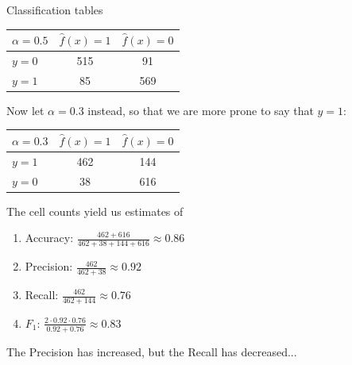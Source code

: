 \documentclass[10pt]{beamer}
\begin{document}
\begin{frame}{Classification tables}

\begin{center}
\begin{tabular}{ l | c | c }
 {\color{uured}$\alpha=0.5$} & $\hat{f}(x)=1$ & $\hat{f}(x)=0$\\
  \hline
  $y=0$ & 515 & 91 \\
  $y=1$ & 85 & 569 \\
  \hline
\end{tabular}
\end{center}
\pause
Now let $\alpha=0.3$ instead, so that we are more prone to say that $\hat{y}=1$:
\begin{center}
\begin{tabular}{ l | c | c }
  {\color{uured}$\alpha=0.3$} & $\hat{f}(x)=1$ & $\hat{f}(x)=0$\\
  \hline
  $y=1$ & 462 & 144 \\
  $y=0$ & 38 & 616 \\
  \hline
\end{tabular}
\end{center}
The cell counts yield us estimates of
\begin{enumerate}
\item Accuracy: $\frac{462+616}{462+38+144+616}\approx 0.86$
\item Precision: $\frac{462}{462+38}\approx 0.92$
\item Recall: $\frac{462}{462+144}\approx 0.76$
\item $F_1$: $\frac{2 \cdot 0.92 \cdot 0.76}{0.92 + 0.76}\approx 0.83$
\end{enumerate}

The Precision has increased, but the Recall has decreased...

\end{frame}
\end{document}
